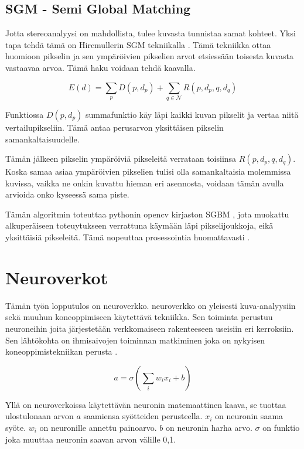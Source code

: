 \subsection{SGM - Semi Global Matching}

Jotta stereoanalyysi on mahdollista,
tulee kuvasta tunnistaa samat kohteet.
Yksi tapa tehdä tämä on Hircmullerin SGM tekniikalla \cite{hirschmuller2005babel}.
Tämä tekniikka ottaa huomioon pikselin ja sen ympäröivien pikselien arvot etsiessään toisesta kuvasta vastaavaa arvoa. Tämä haku voidaan tehdä kaavalla.

\begin{equation}\label{yht:SGM}
    E(d) = \sum_{p} D(p, d_p) + \sum_{q \in \mathcal{N}} R(p, d_p, q, d_q)
\end{equation}

Funktiossa \(D(p, d_p)\) summafunktio käy läpi kaikki kuvan pikselit ja vertaa niitä vertailupikseliin.
Tämä antaa perusarvon yksittäisen pikselin samankaltaisuudelle.

Tämän jälkeen pikselin ympäröiviä pikseleitä verrataan toisiinsa \(R(p, d_p, q, d_q)\).
Koska samaa asiaa ympäröivien pikselien tulisi olla samankaltaisia molemmissa kuvissa,
vaikka ne onkin kuvattu hieman eri asennosta, voidaan tämän avulla arvioida onko kyseessä sama piste.

Tämän algoritmin toteuttaa pythonin opencv kirjaston SGBM \cite{opencvsgbm},
jota muokattu alkuperäiseen toteuytukseen verrattuna käymään läpi pikselijoukkoja, eikä yksittäisiä pikseleitä.
Tämä nopeuttaa prosessointia huomattavasti \cite{MemoryEfficientSGM}.

\section{Neuroverkot} 

Tämän työn lopputulos on neuroverkko.
neuroverkko on yleisesti kuva-analyysiin sekä muuhun koneoppimiseen käytettävä tekniikka.
Sen toiminta perustuu neuroneihin joita järjestetään verkkomaiseen rakenteeseen useisiin eri kerroksiin.
Sen lähtökohta on ihmisaivojen toiminnan matkiminen joka on nykyisen koneoppimistekniikan perusta \cite{PhamTrungQuang2023EotH}.


\begin{equation}\label{yht:neuroni}
    a = \sigma\left(\sum_i w_i x_i + b\right)
\end{equation}

Yllä on neuroverkoissa käytettävän neuronin matemaattinen kaava,
se tuottaa ulostulonaan arvon \(a\) saamiensa syötteiden perusteella.
\(x_i\) on neuronin saama syöte.
\(w_i\) on neuronille annettu painoarvo.
\(b\) on neuronin harha arvo. \(\sigma\) on funktio joka muuttaa neuronin saavan arvon välille 0,1.


